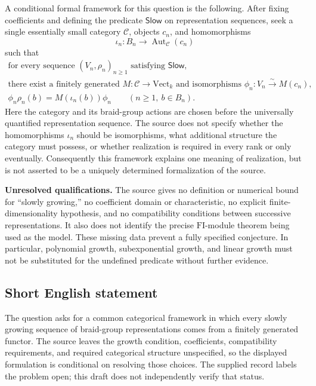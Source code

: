 \documentclass[11pt]{article}
\begin{document}
A conditional formal framework for this question is the following. After fixing coefficients and defining the predicate \(\mathsf{Slow}\) on representation sequences, seek a single essentially small category \(\mathcal C\), objects \(c_n\), and homomorphisms
\[
\iota_n:B_n\longrightarrow\operatorname{Aut}_{\mathcal C}(c_n)
\]
such that
\[
\begin{gathered}
\text{for every sequence }(V_n,\rho_n)_{n\geq1}\text{ satisfying }\mathsf{Slow},\\
\text{there exist a finitely generated }M:\mathcal C\to\mathrm{Vect}_k
\text{ and isomorphisms }\phi_n:V_n\xrightarrow{\sim}M(c_n),\\
\phi_n\rho_n(b)=M(\iota_n(b))\phi_n
\qquad(n\geq1,\ b\in B_n).
\end{gathered}
\]
Here the category and its braid-group actions are chosen before the universally quantified representation sequence. The source does not specify whether the homomorphisms \(\iota_n\) should be isomorphisms, what additional structure the category must possess, or whether realization is required in every rank or only eventually. Consequently this framework explains one meaning of realization, but is not asserted to be a uniquely determined formalization of the source.

\textbf{Unresolved qualifications.} The source gives no definition or numerical bound for ``slowly growing,'' no coefficient domain or characteristic, no explicit finite-dimensionality hypothesis, and no compatibility conditions between successive representations. It also does not identify the precise \(\mathrm{FI}\)-module theorem being used as the model. These missing data prevent a fully specified conjecture. In particular, polynomial growth, subexponential growth, and linear growth must not be substituted for the undefined predicate without further evidence.
\subsection{Short English statement}
The question asks for a common categorical framework in which every slowly growing sequence of braid-group representations comes from a finitely generated functor. The source leaves the growth condition, coefficients, compatibility requirements, and required categorical structure unspecified, so the displayed formulation is conditional on resolving those choices. The supplied record labels the problem open; this draft does not independently verify that status.
\end{document}
